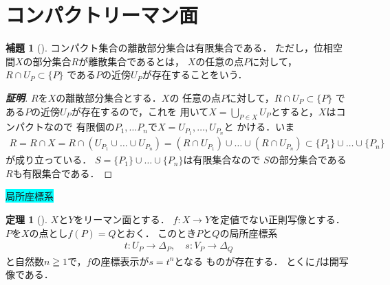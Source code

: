 \documentclass[11pt, a4paper, dvipdfmx, draft]{jsarticle}
\theoremstyle{definition}
\newtheorem{Theorem}[Axiom]{定理}
\newtheorem{Lemma}[Axiom]{補題}
\theoremstyle{mystyle}
\numberwithin{equation}{section} %
\begin{document}
\section{コンパクトリーマン面}

\begin{Lemma}[{\cite[問題2.8]{ogs}}]
    コンパクト集合の離散部分集合は有限集合である．
    ただし，位相空間$X$の部分集合$R$が離散集合であるとは，
    $X$の任意の点$P$に対して，$R\cap U_{P}\subset\{P\}$
    である$P$の近傍$U_P$が存在することをいう．
\end{Lemma}
\begin{proof}[\bf{証明}]
    $R$を$X$の離散部分集合とする．$X$の
    任意の点$P$に対して，$R\cap U_{P}\subset\{P\}$
    である$P$の近傍$U_P$が存在するので，これを
    用いて$X=\bigcup_{P\in X}U_P$とすると，$X$はコンパクトなので
    有限個の$P_1,\dots P_n$で$X=U_{P_{1}},\dots,U_{P_{n}}$と
    かける．いま
    \begin{align*}
        R = R\cap X 
        = R\cap \left(U_{P_{1}}\cup\dots\cup U_{P_{n}}\right)
        = \left(R\cap U_{P_{1}}\right)\cup\dots\cup\left(R\cap U_{P_{n}}\right)
        \subset \{P_1\}\cup\dots\cup\{P_n\}
    \end{align*}
    が成り立っている．
    $S=\{P_1\}\cup\dots\cup\{P_n\}$は有限集合なので
    $S$の部分集合である$R$も有限集合である．
\end{proof}

\colorbox{cyan}{局所座標系}

\begin{Theorem}[{\cite[定理2.18]{ogs}}]
    $X$と$Y$をリーマン面とする．
    $f\colon X\to Y$を定値でない正則写像とする．
    $P$を$X$の点とし$f(P)=Q$とおく．
    このとき$P$と$Q$の局所座標系
    \begin{align*}
        t\colon U_P\to\Delta_P,
        \quad s\colon V_P\to\Delta_Q
    \end{align*}
    と自然数$n\geqq 1$で，$f$の座標表示が$s=t^n$となる
    ものが存在する．
    とくに$f$は開写像である．
\end{Theorem}
\end{document}

